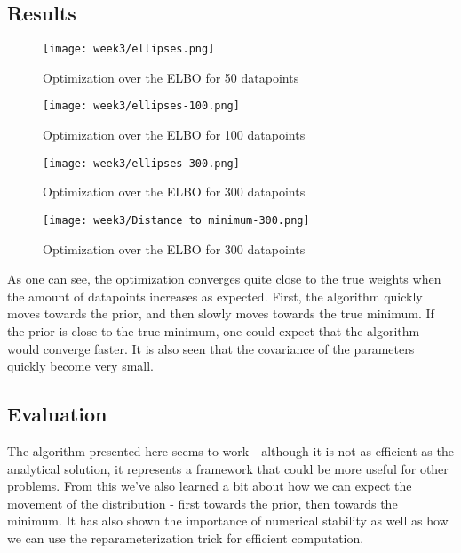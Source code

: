\subsection{Results}
\begin{figure}[H]
  \centering
  \texttt{[image: week3/ellipses.png]}
  \caption{Optimization over the ELBO for 50 datapoints}
\end{figure}
\begin{figure}[H]
  \centering
  \texttt{[image: week3/ellipses-100.png]}
  \caption{Optimization over the ELBO for 100 datapoints}
\end{figure}
\begin{figure}[H]
  \centering
  \texttt{[image: week3/ellipses-300.png]}
  \caption{Optimization over the ELBO for 300 datapoints}
\end{figure}
\begin{figure}[H]
  \centering
  \texttt{[image: week3/Distance to minimum-300.png]}
  \caption{Optimization over the ELBO for 300 datapoints}
\end{figure}
As one can see, the optimization converges quite close to the true weights when the amount of datapoints increases as expected.
First, the algorithm quickly moves towards the prior, and then slowly moves towards the true minimum. 
If the prior is close to the true minimum, one could expect that the algorithm would converge faster.
It is also seen that the covariance of the parameters quickly become very small. 
\subsection{Evaluation}
The algorithm presented here seems to work - although it is not as efficient as the analytical solution, it represents a framework that could be more useful for other problems.
From this we've also learned a bit about how we can expect the movement of the distribution - first towards the prior, then towards the minimum.
It has also shown the importance of numerical stability as well as how we can use the reparameterization trick for efficient computation.

